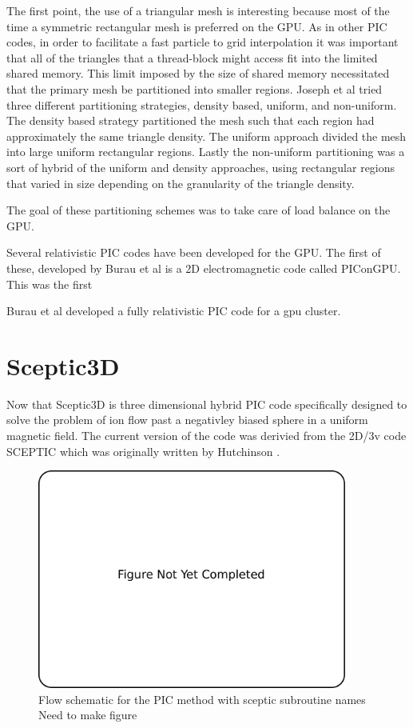 The first point, the use of a triangular mesh is interesting because most of the time a symmetric rectangular mesh is preferred on the GPU. As in other PIC codes, in order to facilitate a fast particle to grid interpolation it was important that all of the triangles that a thread-block might access fit into the limited shared memory. This limit imposed by the size of shared memory necessitated that the primary mesh be partitioned into smaller regions. Joseph et al tried three different partitioning strategies, density based, uniform, and non-uniform. The density based strategy partitioned the mesh such that each region had approximately the same triangle density. The uniform approach divided the mesh into large uniform rectangular regions. Lastly the non-uniform partitioning was a sort of hybrid of the uniform and density approaches, using rectangular regions that varied in size depending on the granularity of the triangle density. 

The goal of these partitioning schemes was to take care of load balance on the GPU.





 Several relativistic PIC codes have been developed for the GPU. The first of these, developed by Burau et al is a 2D electromagnetic code called PIConGPU. This was the first 


Burau et al developed a fully relativistic PIC code for a gpu cluster. 
		

	\section{Sceptic3D}
Now that Sceptic3D is three dimensional hybrid PIC code specifically designed to solve the problem of ion flow past a negativley biased sphere in a uniform magnetic field. The current version of the code was derivied from the 2D/3v code SCEPTIC which was originally written by Hutchinson \cite{Hutchinson2002,Hutchinson2003,Hutchinson2005,Hutchinson2006}.

\begin{figure}
\begin{center}
\includegraphics[width=4in]{introduction/not_finished.pdf}
\end{center}
\caption{Flow schematic for the PIC method with sceptic subroutine names Need to make figure}
\label{fig:pic_flowchart_sceptic}
\end{figure}

